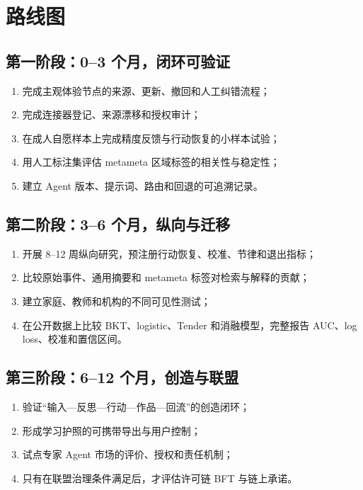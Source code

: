 \documentclass[UTF8,a4paper,11pt]{ctexart}
\begin{document}
\newpage
\section{路线图}

\subsection{第一阶段：0--3 个月，闭环可验证}

\begin{enumerate}
\item 完成主观体验节点的来源、更新、撤回和人工纠错流程；
\item 完成连接器登记、来源漂移和授权审计；
\item 在成人自愿样本上完成精度反馈与行动恢复的小样本试验；
\item 用人工标注集评估 metameta 区域标签的相关性与稳定性；
\item 建立 Agent 版本、提示词、路由和回退的可追溯记录。
\end{enumerate}

\subsection{第二阶段：3--6 个月，纵向与迁移}

\begin{enumerate}
\item 开展 8--12 周纵向研究，预注册行动恢复、校准、节律和退出指标；
\item 比较原始事件、通用摘要和 metameta 标签对检索与解释的贡献；
\item 建立家庭、教师和机构的不同可见性测试；
\item 在公开数据上比较 BKT、logistic、Tender 和消融模型，完整报告 AUC、log loss、校准和置信区间。
\end{enumerate}

\subsection{第三阶段：6--12 个月，创造与联盟}

\begin{enumerate}
\item 验证“输入—反思—行动—作品—回流”的创造闭环；
\item 形成学习护照的可携带导出与用户控制；
\item 试点专家 Agent 市场的评价、授权和责任机制；
\item 只有在联盟治理条件满足后，才评估许可链 BFT 与链上承诺。
\end{enumerate}
\end{document}
